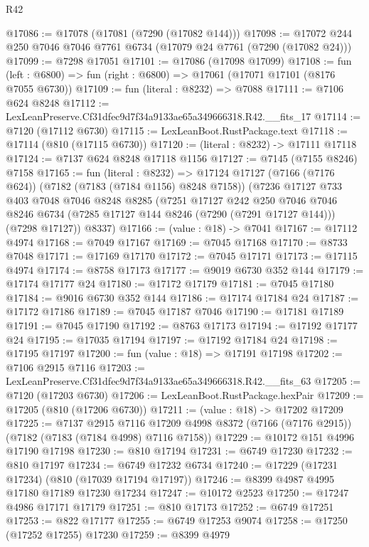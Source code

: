 \begin{lexlean}{R42}
\begin{coremodule}
{@17086 := @17078 (@17081 (@7290 (@17082 @144)))
@17098 := @17072 @244 @250 @7046 @7046 @7761 @6734 (@17079 @24 @7761 (@7290 (@17082 @24)))
@17099 := @7298 @17051
@17101 := @17086 (@17098 @17099)
@17108 := fun (left : @6800) => fun (right : @6800) => @17061 (@17071 @17101 (@8176 @7055 @6730))
@17109 := fun (literal : @8232) => @7088
@17111 := @7106 @624 @8248
@17112 := LexLeanPreserve.Cf31dfec9d7f34a9133ae65a349666318.R42.__fits_17
@17114 := @7120 (@17112 @6730)
@17115 := LexLeanBoot.RustPackage.text
@17118 := @17114 (@810 (@17115 @6730))
@17120 := (literal : @8232) -> @17111 @17118
@17124 := @7137 @624 @8248 @17118 @1156
@17127 := @7145 (@7155 @8246) @7158
@17165 := fun (literal : @8232) =>
  @17124
    @17127
    (@7166 (@7176 @624))
    (@7182 (@7183 (@7184 @1156) @8248 @7158))
    (@7236
      @17127
      @733
      @403
      @7048
      @7046
      @8248
      @8285
      (@7251
        @17127
        @242
        @250
        @7046
        @7046
        @8246
        @6734
        (@7285 @17127 @144 @8246 (@7290 (@7291 @17127 @144)))
        (@7298 @17127))
      @8337)
@17166 := (value : @18) -> @7041
@17167 := @17112 @4974
@17168 := @7049 @17167
@17169 := @7045 @17168
@17170 := @8733 @7048
@17171 := @17169 @17170
@17172 := @7045 @17171
@17173 := @17115 @4974
@17174 := @8758 @17173
@17177 := @9019 @6730 @352 @144
@17179 := @17174 @17177 @24
@17180 := @17172 @17179
@17181 := @7045 @17180
@17184 := @9016 @6730 @352 @144
@17186 := @17174 @17184 @24
@17187 := @17172 @17186
@17189 := @7045 @17187 @7046
@17190 := @17181 @17189
@17191 := @7045 @17190
@17192 := @8763 @17173
@17194 := @17192 @17177 @24
@17195 := @17035 @17194
@17197 := @17192 @17184 @24
@17198 := @17195 @17197
@17200 := fun (value : @18) => @17191 @17198
@17202 := @7106 @2915 @7116
@17203 := LexLeanPreserve.Cf31dfec9d7f34a9133ae65a349666318.R42.__fits_63
@17205 := @7120 (@17203 @6730)
@17206 := LexLeanBoot.RustPackage.hexPair
@17209 := @17205 (@810 (@17206 @6730))
@17211 := (value : @18) -> @17202 @17209
@17225 := @7137
    @2915
    @7116
    @17209
    @4998
    @8372
    (@7166 (@7176 @2915))
    (@7182 (@7183 (@7184 @4998) @7116 @7158))
@17229 := @10172 @151 @4996 @17190 @17198
@17230 := @810 @17194
@17231 := @6749 @17230
@17232 := @810 @17197
@17234 := @6749 @17232 @6734
@17240 := @17229 (@17231 @17234) (@810 (@17039 @17194 @17197))
@17246 := @8399 @4987 @4995 @17180 @17189 @17230 @17234
@17247 := @10172 @2523
@17250 := @17247 @4986 @17171 @17179
@17251 := @810 @17173
@17252 := @6749 @17251
@17253 := @822 @17177
@17255 := @6749 @17253 @9074
@17258 := @17250 (@17252 @17255) @17230
@17259 := @8399 @4979
}
\end{coremodule}
\end{lexlean}
